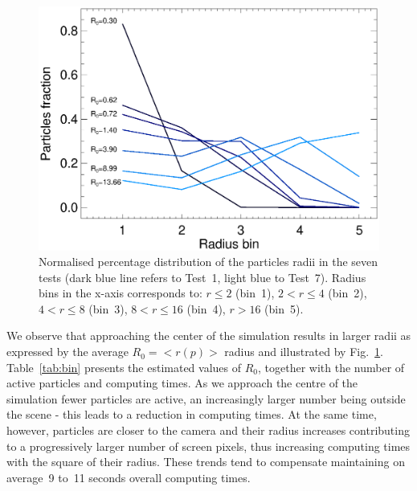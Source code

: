 \documentclass[preprint,5pt]{elsarticle}
\begin{document}
\begin{figure}
\includegraphics[scale=0.5]{radii.eps}
\caption{Normalised percentage distribution of the particles radii in the seven tests (dark blue line refers to Test~1, light blue to Test~7). Radius bins in the x-axis corresponds to: $r\le 2$ (bin~1), $2<r\le 4$ (bin~2), $4<r\le 8$ (bin~3), $8<r\le 16$ (bin~4), $r>16$ (bin~5). 
}
\label{fig:radii}
\end{figure}

We observe that approaching the center of the simulation results in larger radii 
as expressed by the average $R_0=<r(p)>$ radius and illustrated by Fig.~\ref{fig:radii}. 
Table~\ref{tab:bin} presents the estimated values of $R_0$, together with the number of active particles and computing times. As we approach the centre of the simulation fewer particles are active, an increasingly larger number being outside the scene - this leads to a reduction in computing times. At the same time, however, particles are closer to the camera and their radius increases contributing to a progressively larger number of screen pixels,
thus increasing computing times with the square of their radius. 
These trends tend to compensate maintaining on average~9 to~11 seconds overall computing times.
\end{document}
